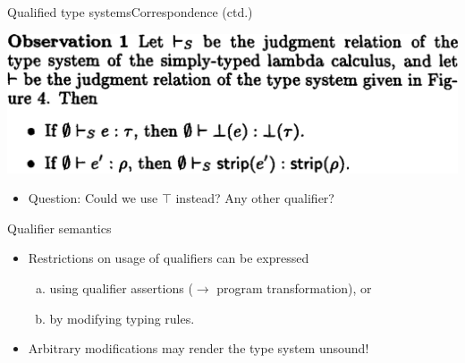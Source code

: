 \documentclass{beamer}
\begin{document}

\begin{frame}{Qualified type systems}{Correspondence (ctd.)}
  \begin{center}
  \includegraphics[scale=0.25]{paper_observation1.png}
  \end{center}

  \bigskip
  \begin{itemize}
  \item<2-> Question: Could we use $\top$ instead? Any other qualifier?
  \end{itemize}
\end{frame}



\begin{frame}{Qualifier semantics}
  \begin{itemize}
  \item Restrictions on usage of qualifiers can be expressed
    \begin{enumerate}[a)]
    \item using qualifier assertions ($\rightarrow$ program transformation), or
    \item by modifying typing rules.
    \end{enumerate}
  \item Arbitrary modifications may render the type system unsound!
  \end{itemize}
\end{frame}
\end{document}

